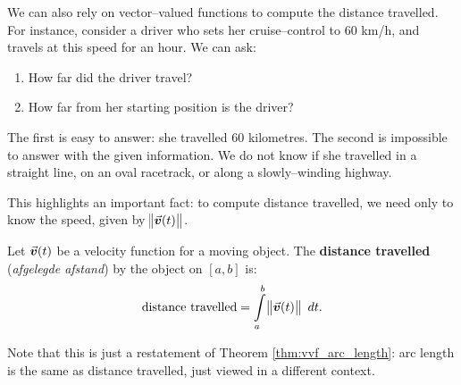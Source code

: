 We can also rely on vector--valued functions to compute the distance travelled. For instance, consider a driver who sets her cruise--control to 60 km/h, and travels at this speed for an hour. We can ask:
\begin{enumerate}
	\item How far did the driver travel?
	\item	How far from her starting position is the driver?
\end{enumerate} 
The first is easy to answer: she travelled 60 kilometres. The second is impossible to answer with the given information. We do not know if she travelled in a straight line, on an oval racetrack, or along a slowly--winding highway.

This highlights an important fact: to compute distance travelled, we need only to know the speed, given by $\norm{\vvt}$.

\begin{definition}\label{thm:distance_traveled}
Let $\vvt$ be a velocity function for a moving object. The \textbf{distance travelled} (\textit{afgelegde afstand}) by the object on $[a,b]$ is:
$$\text{distance travelled} = \int\limits_a^b \norm{\vvt}\ dt.$$
\end{definition}
Note that this is just a restatement of Theorem \ref{thm:vvf_arc_length}: arc length is the same as distance travelled, just viewed in a different context.


